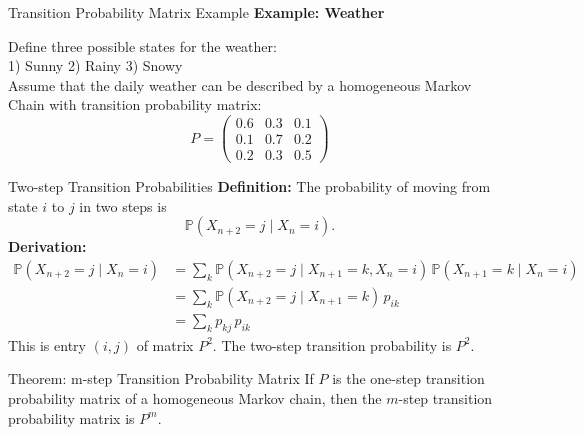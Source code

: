 \documentclass[8pt]{beamer}
\begin{document}
\begin{frame}{Transition Probability Matrix Example}
\textbf{Example: Weather}
\vspace{3mm}

Define three possible states for the weather:\\
\vspace{3mm}
1) Sunny  \hspace{1cm}   2) Rainy \hspace{1cm}  3) Snowy\\
\vspace{3mm}
Assume that the daily weather can be described by a homogeneous Markov Chain with transition probability matrix:
\begin{equation*}
P=\left( 
\begin{array}{ccc}
0.6&0.3& 0.1 \\
0.1&0.7& 0.2\\
0.2&0.3& 0.5
\end{array}
\right)
\end{equation*}
\end{frame}

\begin{frame}{Two-step Transition Probabilities}
\textbf{Definition:}  
The probability of moving from state $i$ to $j$ in two steps is
\begin{equation*}
\mathbb{P}(X_{n+2}=j \mid X_n=i).
\end{equation*}
\textbf{Derivation:}
\begin{align*}
\mathbb{P}(X_{n+2}=j \mid X_n=i) 
& = \sum_{k} \mathbb{P}(X_{n+2}=j \mid X_{n+1}=k, X_n=i)\,\mathbb{P}(X_{n+1}=k \mid X_n=i)\\
& = \sum_{k} \mathbb{P}(X_{n+2}=j \mid X_{n+1}=k)\, p_{ik}\\
& = \sum_{k} p_{kj}\, p_{ik}
\end{align*}
This is entry $(i,j)$ of matrix $P^2$.
\alert{The two-step transition probability is \textbf{$P^2$}}.

\begin{block}{Theorem: m-step Transition Probability Matrix}
\vspace{0.5mm}
If $P$ is the one-step transition probability matrix of a homogeneous Markov chain,  
then the $m$-step transition probability matrix is $P^m$.
\end{block}
\end{frame}
\end{document}
